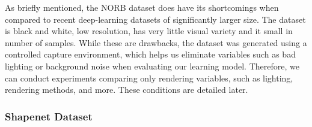 \documentclass[10pt,twocolumn,letterpaper]{article}
\newcommand{\tompson}[1]{{\color{green} JT: #1}}
\begin{document}
As briefly mentioned, the NORB dataset does have its shortcomings when compared to recent deep-learning datasets of significantly larger size. The dataset is black and white, low resolution, has very little visual variety and it small in number of samples. While these are drawbacks, the dataset was generated using a controlled capture environment, which helps us eliminate variables such as bad lighting or background noise when evaluating our learning model. Therefore, we can conduct experiments comparing only rendering variables, such as lighting, rendering methods, and more. These conditions are detailed later.

%

\subsubsection{Shapenet Dataset}
\end{document}
